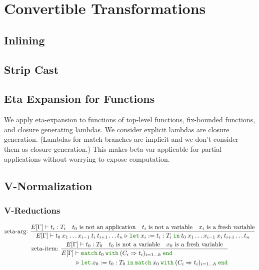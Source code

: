 \documentclass[a4paper,fleqn]{article}
\newcommand{\kwlet}{\mbox{\color{mygreen}\ttfamily let}}
\newcommand{\kwin}{\mbox{\color{mygreen}\ttfamily in}}
\newcommand{\kwmatch}{\mbox{\color{mygreen}\ttfamily match}}
\newcommand{\kwwith}{\mbox{\color{mygreen}\ttfamily with}}
\newcommand{\kwend}{\mbox{\color{mygreen}\ttfamily end}}
\newcommand{\letin}[3]{\kwlet\:#1:=#2\:\kwin\:#3}
\newcommand{\match}[4]{\kwmatch\:#1\:\kwwith\:(#2 \Rightarrow #3)_{#4}\:\kwend}
\newcommand{\reltri}{\mathrel{\triangleright}}
\begin{document}
\section{Convertible Transformations}\label{sec:convertible-transformations}

\subsection{Inlining}\label{sec:inlining}
\subsection{Strip Cast}\label{sec:strip-cast}
\subsection{Eta Expansion for Functions}\label{sec:eta-expand-funcs}
We apply eta-expansion to functions of top-level functions, fix-bounded functions, and closure generating lambdas.
We consider explicit lambdas are closure generation.
(Lambdas for match-branches are implicit and we don't consider them as closure generation.)
This makes beta-var applicable for partial applications without worrying to expose computation.

\subsection{V-Normalization}\label{sec:v-normalization}
\subsubsection{V-Reductions}\label{sec:v-reductions}
\begin{gather*}
  \text{zeta-arg:}~
    \dfrac
    {
      E[\Gamma] \vdash t_i : T_i \quad
      \text{$t_0$ is not an application} \quad
      \text{$t_i$ is not a variable} \quad
      \text{$x_i$ is a fresh variable}
    }{
      E[\Gamma] \vdash
      t_0\:x_1 \ldots x_{i-1}\:t_i\:t_{i+1} \ldots t_n
      \reltri
      \letin{x_i}{t_i:T_i}{t_0\:x_1 \ldots x_{i-1}\:x_i\:t_{i+1} \ldots t_n}
    } \\
  \text{zeta-item:}~
    \dfrac
    {
      E[\Gamma] \vdash t_0 : T_0 \quad
      \text{$t_0$ is not a variable} \quad
      \text{$x_0$ is a fresh variable}
    }{
      \begin{aligned}
      E[\Gamma] \vdash\; &
        \match{t_0}{C_i}{t_i}{i=1\ldots h} \\
      \reltri\; &
        \letin{x_0}{t_0:T_0}{\match{x_0}{C_i}{t_i}{i=1\ldots h}}
      \end{aligned}
    }
\end{gather*}
\end{document}
